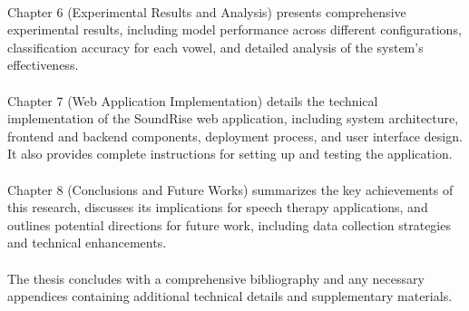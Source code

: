 \paragraph{}
Chapter 6 (Experimental Results and Analysis) presents comprehensive experimental results, including model performance across different configurations, classification accuracy for each vowel, and detailed analysis of the system's effectiveness.

\paragraph{}
Chapter 7 (Web Application Implementation) details the technical implementation of the SoundRise web application, including system architecture, frontend and backend components, deployment process, and user interface design. It also provides complete instructions for setting up and testing the application.

\paragraph{}
Chapter 8 (Conclusions and Future Works) summarizes the key achievements of this research, discusses its implications for speech therapy applications, and outlines potential directions for future work, including data collection strategies and technical enhancements.

\paragraph{}
The thesis concludes with a comprehensive bibliography and any necessary appendices containing additional technical details and supplementary materials.

